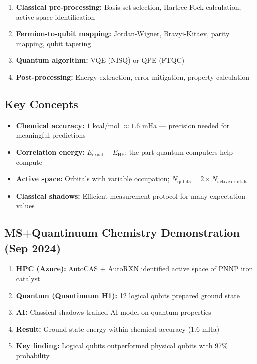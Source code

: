 \documentclass[11pt,a4paper]{article}
\begin{document}
\begin{enumerate}
    \item \textbf{Classical pre-processing:} Basis set selection, Hartree-Fock calculation, active space identification
    \item \textbf{Fermion-to-qubit mapping:} Jordan-Wigner, Bravyi-Kitaev, parity mapping, qubit tapering
    \item \textbf{Quantum algorithm:} VQE (NISQ) or QPE (FTQC)
    \item \textbf{Post-processing:} Energy extraction, error mitigation, property calculation
\end{enumerate}

\subsection{Key Concepts}
\begin{itemize}
    \item \textbf{Chemical accuracy:} $1$ kcal/mol $\approx 1.6$ mHa --- precision needed for meaningful predictions
    \item \textbf{Correlation energy:} $E_{\mathrm{exact}} - E_{\mathrm{HF}}$; the part quantum computers help compute
    \item \textbf{Active space:} Orbitals with variable occupation; $N_{\mathrm{qubits}} = 2 \times N_{\mathrm{active\ orbitals}}$
    \item \textbf{Classical shadows:} Efficient measurement protocol for many expectation values
\end{itemize}

\subsection{MS+Quantinuum Chemistry Demonstration (Sep 2024)}

\begin{importantbox}
\begin{enumerate}
    \item \textbf{HPC (Azure):} AutoCAS + AutoRXN identified active space of PNNP iron catalyst
    \item \textbf{Quantum (Quantinuum H1):} 12 logical qubits prepared ground state
    \item \textbf{AI:} Classical shadows trained AI model on quantum properties
    \item \textbf{Result:} Ground state energy within chemical accuracy (1.6 mHa)
    \item \textbf{Key finding:} Logical qubits outperformed physical qubits with 97\% probability
\end{enumerate}
\end{importantbox}
\end{document}
